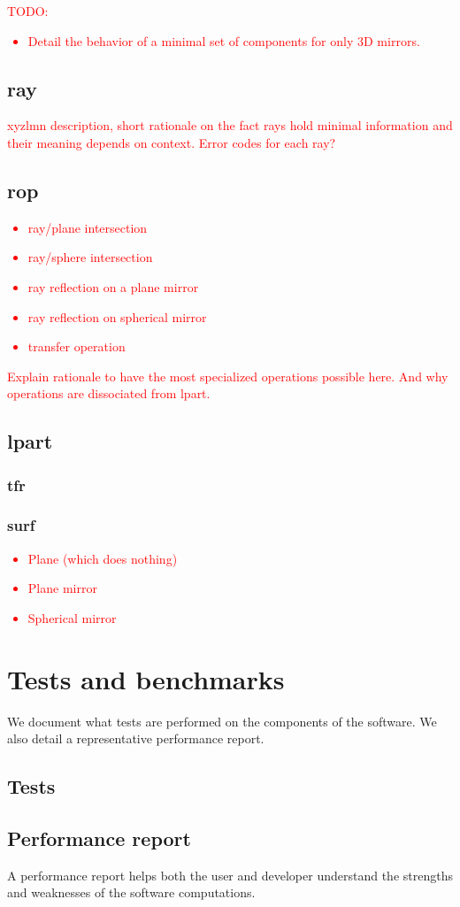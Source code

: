 \textcolor{red}{TODO: \begin{itemize}
\item Detail the behavior of a minimal set of components for
only 3D mirrors.
\end{itemize}}

\subsection{ray}

\textcolor{red}{xyzlmn description, short rationale on the fact rays hold
minimal information and their meaning depends on context.
Error codes for each ray?}

\subsection{rop}

\textcolor{red}{
\begin{itemize}
\item ray/plane intersection
\item ray/sphere intersection
\item ray reflection on a plane mirror
\item ray reflection on spherical mirror
\item transfer operation
\end{itemize}
Explain rationale to have the most specialized operations possible here.
And why operations are dissociated from lpart.}

\subsection{lpart}

\subsubsection{tfr}

\subsubsection{surf}
\textcolor{red}{
\begin{itemize}
\item Plane (which does nothing)
\item Plane mirror
\item Spherical mirror
\end{itemize}}

\section{Tests and benchmarks}
We document what tests are performed on the components of the software.
We also detail a representative performance report.

\subsection{Tests}

\subsection{Performance report}
A performance report helps both the user and developer understand the strengths
and weaknesses of the software computations.
